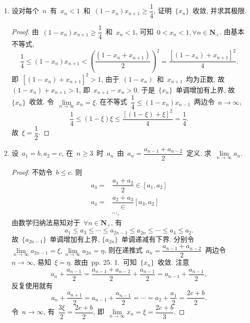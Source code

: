 \documentclass[UTF8,a4paper,11pt,twoside]{book}
\begin{document}
\begin{enumerate}
	\item 设对每个~$n$~有~$x_n<1$~和~$(1-x_n)x_{n+1}\geqslant \dfrac{1}{4}$, 证明~$\{x_n\}$~收敛, 并求其极限.
	      \begin{proof}
		      由~$(1-x_n)x_{n+1}\geqslant \dfrac{1}{4}$~和~$x_n<1$, 可知~$0<x_n<1, \forall n\in\mathbf{N}_{+}$. 由基本不等式,
		      \[
			      \dfrac{1}{4}\leqslant (1-x_n)x_{n+1}<\left(\dfrac{(1-x_n+x_{n+1})}{2}\right)^2=\dfrac{[(1-x_n)+x_{n+1}]^2}{4}.
		      \]
		      即~$[(1-x_n)+x_{n+1}]^2>1$, 由于~$(1-x_n)$~和~$x_{n+1}$~均为正数, 故~$(1-x_n)+x_{n+1}>1$, 即~$x_{n+1}-x_n>0$. 于是~$\{x_n\}$~单调增加有上界, 故~$\{x_n\}$~收敛. 令~$\lim\limits_{n\to\infty} x_n=\xi$. 在不等式~$\dfrac{1}{4}\leqslant(1-x_n)x_{n-1}$~两边令~$n\to\infty$,
		      \[
			      \dfrac{1}{4}\leqslant (1-\xi)\xi \leqslant\dfrac{[(1-\xi)+\xi]^2}{4}=\dfrac{1}{4}.
		      \]
		      故~$\xi=\dfrac{1}{2}$. \qedhere
	      \end{proof}

	\item 设~$a_1=b, a_2=c$, 在~$n\geqslant 3$~时~$a_n$~由~$a_n=\dfrac{a_{n-1}+a_{n-2}}{2}$~定义. 求~$\lim\limits_{n\to\infty} a_n$.
	      \begin{proof}
		      不妨令~$b\leqslant c$. 则
		      \[
			      \begin{split}
				      a_3=&\dfrac{a_1+a_2}{2}\in[a_1,a_2]\\
				      a_4=&\dfrac{a_2+a_3}\in[a_3, a_2]\\
				      &\cdots,
			      \end{split}
		      \]
		      由数学归纳法易知对于~$\forall n\in\mathbf{N}_{+}$, 有
		      \[
			      a_1\leqslant a_3\leqslant\cdots\leqslant a_{2n-1}\leqslant a_{2n}\leqslant\cdots\leqslant a_4\leqslant a_2.
		      \]
		      故~$\{a_{2n-1}\}$~单调增加有上界, $\{a_{2n}\}$~单调递减有下界. 分别令~$\lim\limits_{n\to\infty} a_{2n-1}=\xi, \lim\limits_{n\to\infty} a_{2n}=\eta$, 则在递推式~$a_n=\dfrac{a_{n-1}+a_{n-2}}{2}$~两边令~$n\to\infty$, 易知~$\xi=\eta$. 故由~pp. 25. 1.~可知~$\{x_n\}$~收敛. 注意
		      \[
			      a_n+\dfrac{a_{n-1}}{2}=\dfrac{a_{n-1}+a_{n-2}}{2}+\dfrac{a_{n-1}}{2}=a_{n-1}+\dfrac{a_{n-1}}{2},
		      \]
		      反复使用就有
		      \[
			      a_n+\dfrac{a_{n+1}}{2}=a_{n-1}+\dfrac{a_{n-1}}{2}=\cdots=a_2+\dfrac{a_1}{2}=\dfrac{2c+b}{2}.
		      \]
		      令~$n\to\infty$, 有~$\dfrac{3\xi}{2}=\dfrac{2c+b}{2}$, 即~$\lim\limits_{n\to\infty} x_n=\xi=\dfrac{2c+b}{3}$. \qedhere
	      \end{proof}


\end{enumerate}
\end{document}
